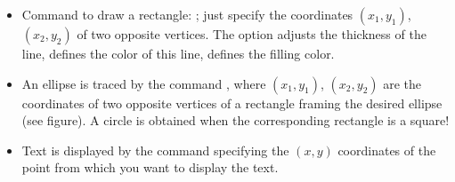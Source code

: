 \documentclass[11pt,class=report,crop=false]{standalone}
\begin{document}
\begin{cours}
\begin{itemize}
  \item Command to draw a rectangle: ; just specify the coordinates $(x_1,y_1)$, $(x_2,y_2)$ of two opposite vertices. The option  adjusts the thickness of the line,  defines the color of this line,  defines the filling color.
  
  \item An ellipse is traced by the command , where $(x_1,y_1)$, $(x_2,y_2)$ are the coordinates of two opposite vertices of a rectangle framing the desired ellipse (see figure). A circle is obtained when the corresponding rectangle is a square!  
  
  \item Text is displayed by the command  specifying the $(x,y)$ coordinates of the point from which you want to display the text. 
  
\end{itemize}


\end{cours}


\end{document}
